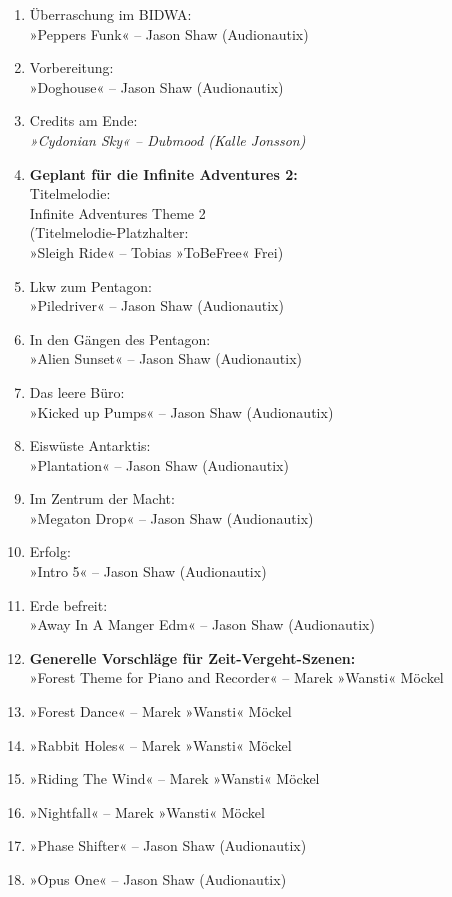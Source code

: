 \begin{enumerate}
    \item Überraschung im BIDWA:\\ »Peppers Funk« – Jason Shaw (Audionautix)
    \item Vorbereitung:\\ »Doghouse« – Jason Shaw (Audionautix)
    \item Credits am Ende:\\ \textit{»Cydonian Sky« – Dubmood (Kalle Jonsson)}
    \item \textbf{Geplant für die Infinite Adventures 2:}\\ Titelmelodie:\\ Infinite Adventures Theme 2\\(Titelmelodie-Platzhalter:\\ »Sleigh Ride« – Tobias »ToBeFree« Frei)
    \item Lkw zum Pentagon:\\ »Piledriver« – Jason Shaw (Audionautix)
    \item In den Gängen des Pentagon:\\ »Alien Sunset« – Jason Shaw (Audionautix)
    \item Das leere Büro:\\ »Kicked up Pumps« – Jason Shaw (Audionautix)
    \item Eiswüste Antarktis:\\ »Plantation« – Jason Shaw (Audionautix)
    \item Im Zentrum der Macht:\\ »Megaton Drop« – Jason Shaw (Audionautix)
    \item Erfolg:\\ »Intro 5« – Jason Shaw (Audionautix)
    \item Erde befreit:\\ »Away In A Manger Edm« – Jason Shaw (Audionautix)
    \item \textbf{Generelle Vorschläge für Zeit-Vergeht-Szenen:}\\ »Forest Theme for Piano and Recorder« – Marek »Wansti« Möckel
    \item »Forest Dance« – Marek »Wansti« Möckel
    \item »Rabbit Holes« – Marek »Wansti« Möckel
    \item »Riding The Wind« – Marek »Wansti« Möckel
    \item »Nightfall« – Marek »Wansti« Möckel
    \item »Phase Shifter« – Jason Shaw (Audionautix)
    \item »Opus One« – Jason Shaw (Audionautix)

\end{enumerate}
